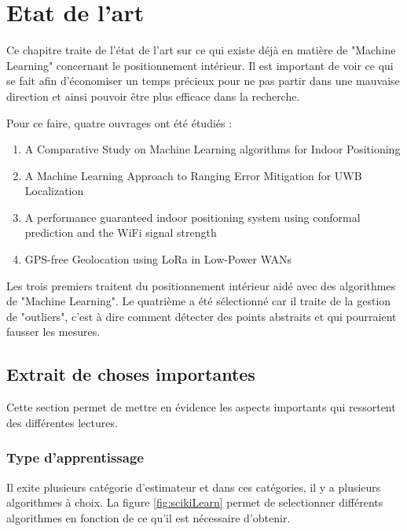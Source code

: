 \chapter{Etat de l'art}
Ce chapitre traite de l'état de l'art sur ce qui existe déjà en matière de "Machine Learning" concernant le positionnement intérieur. Il est important de voir ce qui se fait afin d'économiser un temps précieux pour ne pas partir dans une mauvaise direction et ainsi pouvoir être plus efficace dans la recherche. 

Pour ce faire, quatre ouvrages ont été étudiés :

\begin{enumerate}
	\item A Comparative Study on Machine Learning algorithms for Indoor Positioning \cite{ML_algo}
	\item A Machine Learning Approach to Ranging Error Mitigation for UWB Localization \cite{ML_UWB}
	\item A performance guaranteed indoor positioning system using conformal prediction and the WiFi signal strength \cite{CP_RSS}
	\item GPS-free Geolocation using LoRa in Low-Power WANs \cite{ML_indoor}
\end{enumerate}

Les trois premiers traitent du positionnement intérieur aidé avec des algorithmes de "Machine Learning". Le quatrième a été sélectionné car il traite de la gestion de "outliers", c'est à dire comment détecter des points abstraits et qui pourraient fausser les mesures. 

\section{Extrait de choses importantes}
Cette section permet de mettre en évidence les aspects importants qui ressortent des différentes lectures. 

\subsection{Type d'apprentissage}
Il exite plusieurs catégorie d'estimateur et dans ces catégories, il y a plusieurs algorithmes à choix. La figure \ref{fig:scikiLearn} permet de selectionner différents algorithmes en fonction de ce qu'il est nécessaire d'obtenir. 

